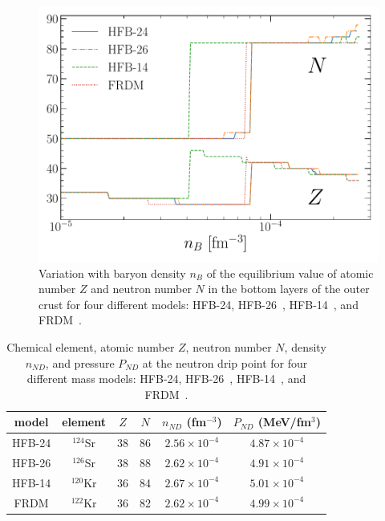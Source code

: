 \begin{figure}[!t]
\begin{center}
  \includegraphics[width=0.8\linewidth]{figures/ocrust_model.pdf}
\end{center}
\caption[Ground-state composition versus baryon density in the 
outer crust]{Variation with baryon density $n_B$ of the equilibrium value of 
  atomic number $Z$ and neutron number $N$ in the bottom layers of the outer 
  crust for four different models: HFB-24, HFB-26~\cite{Goriely2013}, 
  HFB-14~\cite{Goriely2007}, and FRDM~\cite{Moller1995}.}\label{fig:ocrust_model}
\end{figure}

\begin{table}
\begin{center}
\begin{tabular}{cccccc} 
  \toprule
  \toprule
  model & element & $Z$ & $N$ & $n_{ND}$ (fm$^{-3}$) & $P_{ND}$ (MeV/fm$^3$)\\
  \midrule
  HFB-24 & $^{124}$Sr & 38 & 86 & $2.56\times 10^{-4}$ & $4.87\times 10^{-4}$\\
  HFB-26 & $^{126}$Sr & 38 & 88 & $2.62\times 10^{-4}$ & $4.91\times 10^{-4}$\\
  HFB-14 & $^{120}$Kr & 36 & 84 & $2.67\times 10^{-4}$ & $5.01\times 10^{-4}$\\
  FRDM   & $^{122}$Kr & 36 & 82 & $2.62\times 10^{-4}$ & $4.99\times 10^{-4}$\\
  \bottomrule
  \bottomrule
\end{tabular}
\end{center}
\caption[Ground state of matter at the neutron-drip point]{Chemical element, atomic 
  number $Z$, neutron number $N$, density
$n_{ND}$, and pressure $P_{ND}$ at the neutron drip point for four different
mass models: HFB-24, HFB-26~\cite{Goriely2013}, HFB-14~\cite{Goriely2007}, and
FRDM~\cite{Moller1995}.}\label{table:drip} 
\end{table}

